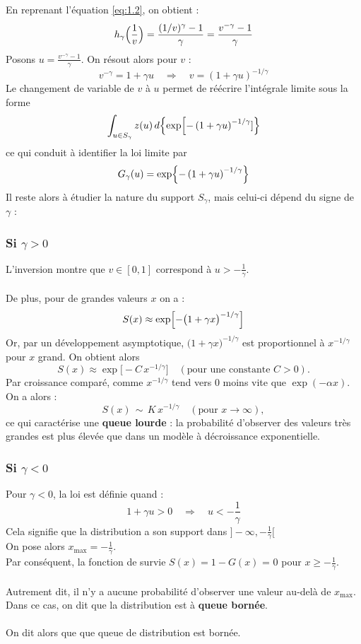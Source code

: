 \documentclass{article}
\begin{document}
En reprenant l'équation \eqref{eq:1.2}, on obtient :
\[
h_\gamma\Bigl(\frac{1}{v}\Bigr)=\frac{(1/v)^\gamma-1}{\gamma}=\frac{v^{-\gamma}-1}{\gamma}
\]
Posons \(u=\frac{v^{-\gamma}-1}{\gamma}\). On résout alors pour \(v\) :
\[
v^{-\gamma}=1+\gamma u\quad\Longrightarrow\quad v=(1+\gamma u)^{-1/\gamma}
\]
Le changement de variable de \(v\) à \(u\) permet de réécrire l'intégrale limite sous la forme
\[
\int_{u\in S_\gamma} z(u)\,d\Bigl\{\exp\Bigl[-\left(1+\gamma u\right)^{-1/\gamma}]\Bigr\}
\]
ce qui conduit à identifier la loi limite par
\[
G_\gamma(u)=\exp\Bigl\{-\left(1+\gamma u\right)^{-1/\gamma}\Bigr\}
\]
Il reste alors à étudier la nature du support \(S_\gamma\), mais celui-ci dépend du signe de \(\gamma\) :

\subsubsection{Si \(\gamma>0\)}
L'inversion montre que \(v\in [0,1]\) correspond à \(u>-\frac{1}{\gamma}\).
\\
\\
De plus, pour de grandes valeurs \(x\) on a :
\[
S(x) \approx \exp\Bigl[-\bigl(1 + \gamma x\bigr)^{-1/\gamma}\Bigr]
\]
Or, par un développement asymptotique,  \(\bigl(1 + \gamma x\bigr)^{-1/\gamma}\) est proportionnel à \(x^{-1/\gamma}\) pour \(x\) grand. On obtient alors
\[
S(x) \approx \exp\bigl[-C\,x^{-1/\gamma}\bigr] 
\quad (\text{pour une constante } C>0).
\]
Par croissance comparé, comme \(x^{-1/\gamma}\) tend vers 0 moins vite que \(\exp(-\alpha x)\). On a alors : 
\[
S(x)\,\sim\, K\,x^{-1/\gamma} 
\quad (\text{pour } x\to\infty),
\]
ce qui caractérise une \textbf{queue lourde} : la probabilité d'observer des valeurs très grandes est plus élevée que dans un modèle à décroissance exponentielle.

\subsubsection{Si \(\gamma<0\)}
Pour \(\gamma < 0\), la loi est définie quand :
\[
1 + \gamma u > 0 \quad \Longrightarrow \quad u < - \frac{1}{\gamma}
\]
Cela signifie que la distribution a son support dans \(]-\infty, - \frac{1}{\gamma} [ \) 
\\
On pose alors \(x_{\max} = - \frac{1}{\gamma} \).
\\
Par conséquent, la fonction de survie $S(x) = 1 - G(x)$ = 0 pour \(x \ge - \frac{1}{\gamma} \).
\\
\\
Autrement dit, il n'y a aucune probabilité d'observer une valeur au-delà de \(x_{\max}\). Dans ce cas, on dit que la distribution est à \textbf{queue bornée}.
\\
\\
On dit alors que que queue de distribution est bornée.
\end{document}
